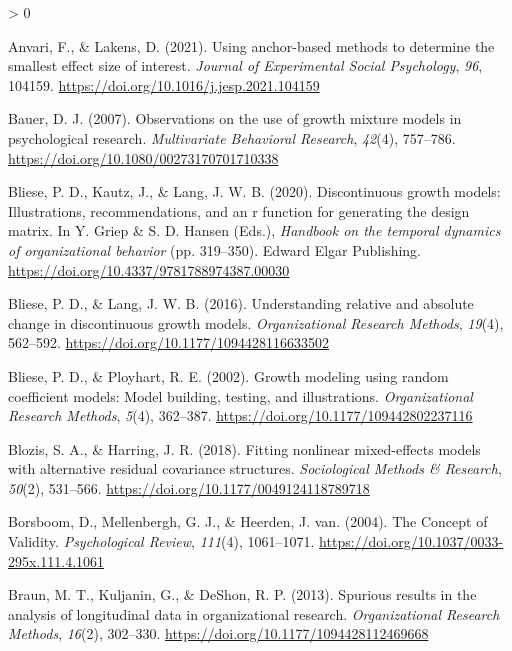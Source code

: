 \documentclass[
12pt, %
twoside,
english]{guelphthesis}
\newlength{\cslhangindent}
\newenvironment{CSLReferences}[2] %
 {%
  \setlength{\parindent}{0pt}
  \ifodd #1 \everypar{\setlength{\hangindent}{\cslhangindent}}\ignorespaces\fi
  \ifnum #2 > 0
  \setlength{\parskip}{\linespacing{2}}
  \fi
 }%
 {}
\begin{document}
\hypertarget{refs}{}
\begin{CSLReferences}{1}{0}
\leavevmode{}%
Anvari, F., \& Lakens, D. (2021). Using anchor-based methods to determine the smallest effect size of interest. \emph{Journal of Experimental Social Psychology}, \emph{96}, 104159. \url{https://doi.org/10.1016/j.jesp.2021.104159}

\leavevmode{}%
Bauer, D. J. (2007). Observations on the use of growth mixture models in psychological research. \emph{Multivariate Behavioral Research}, \emph{42}(4), 757--786. \url{https://doi.org/10.1080/00273170701710338}

\leavevmode{}%
Bliese, P. D., Kautz, J., \& Lang, J. W. B. (2020). Discontinuous growth models: Illustrations, recommendations, and an r function for generating the design matrix. In Y. Griep \& S. D. Hansen (Eds.), \emph{Handbook on the temporal dynamics of organizational behavior} (pp. 319--350). Edward Elgar Publishing. \url{https://doi.org/10.4337/9781788974387.00030}

\leavevmode{}%
Bliese, P. D., \& Lang, J. W. B. (2016). Understanding relative and absolute change in discontinuous growth models. \emph{Organizational Research Methods}, \emph{19}(4), 562--592. \url{https://doi.org/10.1177/1094428116633502}

\leavevmode{}%
Bliese, P. D., \& Ployhart, R. E. (2002). Growth modeling using random coefficient models: Model building, testing, and illustrations. \emph{Organizational Research Methods}, \emph{5}(4), 362--387. \url{https://doi.org/10.1177/109442802237116}

\leavevmode{}%
Blozis, S. A., \& Harring, J. R. (2018). Fitting nonlinear mixed-effects models with alternative residual covariance structures. \emph{Sociological Methods \& Research}, \emph{50}(2), 531--566. \url{https://doi.org/10.1177/0049124118789718}

\leavevmode{}%
Borsboom, D., Mellenbergh, G. J., \& Heerden, J. van. (2004). The Concept of Validity. \emph{Psychological Review}, \emph{111}(4), 1061--1071. \url{https://doi.org/10.1037/0033-295x.111.4.1061}

\leavevmode{}%
Braun, M. T., Kuljanin, G., \& DeShon, R. P. (2013). Spurious results in the analysis of longitudinal data in organizational research. \emph{Organizational Research Methods}, \emph{16}(2), 302--330. \url{https://doi.org/10.1177/1094428112469668}


\end{CSLReferences}
\end{document}
